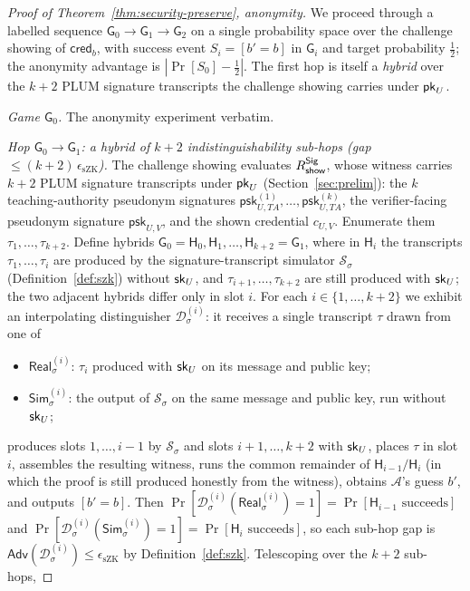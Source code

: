 \begin{proof}[Proof of Theorem~\ref{thm:security-preserve}, anonymity]
We proceed through a labelled sequence $\mathsf G_0\to\mathsf G_1\to\mathsf G_2$ on a single probability space over the challenge showing of $\mathsf{cred}_b$, with success event $S_i=[b'=b]$ in $\mathsf G_i$ and target probability $\tfrac12$; the anonymity advantage is $|\Pr[S_0]-\tfrac12|$. The first hop is itself a \emph{hybrid} over the $k+2$ PLUM signature transcripts the challenge showing carries under $\mathsf{pk}_U$.

    \smallskip\noindent\emph{Game $\mathsf G_0$.} The anonymity experiment
verbatim.

    \smallskip\noindent\emph{Hop $\mathsf G_0\to\mathsf G_1$: a hybrid of $k+2$
indistinguishability sub-hops (gap $\le(k+2)\,\epsilon_{\mathrm{sZK}}$).} The challenge showing evaluates $R^{\mathsf{Sig}}_{\mathsf{show}}$, whose witness carries $k+2$ PLUM signature transcripts under $\mathsf{pk}_U$ (Section~\ref{sec:prelim}): the $k$ teaching-authority pseudonym signatures $\mathsf{psk}_{U,TA}^{(1)},\dots,\mathsf{psk}_{U,TA}^{(k)}$, the verifier-facing pseudonym signature $\mathsf{psk}_{U,V}$, and the shown credential $c_{U,V}$. Enumerate them $\tau_1,\dots,\tau_{k+2}$. Define hybrids $\mathsf G_0=\mathsf H_0,\mathsf H_1,\dots,\mathsf H_{k+2}=\mathsf G_1$, where in $\mathsf H_i$ the transcripts $\tau_1,\dots,\tau_i$ are produced by the signature-transcript simulator $\mathcal S_\sigma$ (Definition~\ref{def:szk}) without $\mathsf{sk}_U$, and $\tau_{i+1},\dots,\tau_{k+2}$ are still produced with $\mathsf{sk}_U$; the two adjacent hybrids differ only in slot $i$. For each $i\in\{1,\dots,k+2\}$ we exhibit an interpolating distinguisher $\mathcal D_\sigma^{(i)}$: it receives a single transcript $\tau$ drawn from one of
    \begin{itemize}
      \item $\mathsf{Real}_\sigma^{(i)}$: $\tau_i$ produced with $\mathsf{sk}_U$ on its
      message and public key;
      \item $\mathsf{Sim}_\sigma^{(i)}$: the output of $\mathcal S_\sigma$ on the
      same message and public key, run without $\mathsf{sk}_U$;
    \end{itemize}
produces slots $1,\dots,i-1$ by $\mathcal S_\sigma$ and slots $i+1,\dots,k+2$ with $\mathsf{sk}_U$, places $\tau$ in slot $i$, assembles the resulting witness, runs the common remainder of $\mathsf H_{i-1}/\mathsf H_i$ (in which the proof is still produced honestly from the witness), obtains $\mathcal A$'s guess $b'$, and outputs $[b'=b]$. Then $\Pr[\mathcal D_\sigma^{(i)}(\mathsf{Real}_\sigma^{(i)})=1]=\Pr[\mathsf H_{i-1} \text{ succeeds}]$ and $\Pr[\mathcal D_\sigma^{(i)}(\mathsf{Sim}_\sigma^{(i)})=1]=\Pr[\mathsf H_i \text{ succeeds}]$, so each sub-hop gap is $\mathsf{Adv}(\mathcal D_\sigma^{(i)})\le\epsilon_{\mathrm{sZK}}$ by Definition~\ref{def:szk}. Telescoping over the $k+2$ sub-hops,

\end{proof}
